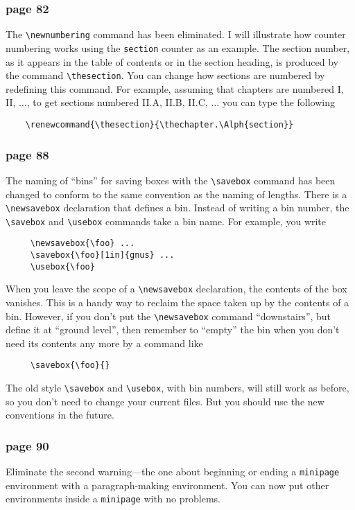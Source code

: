 \subsubsection*{page 82}
The \hbox{\verb"\newnumbering"} command has been eliminated.  I will
illustrate how counter numbering works using the \hbox{\verb"section"}
counter as an example.  The section number, as it appears in the
table of contents or in the section heading, is produced by the
command \hbox{\verb"\thesection"}.  You can change how sections
are numbered by redefining this command.  For example, assuming
that chapters are numbered I, II, $\ldots$, to get sections
numbered II.A, II.B, II.C, $\ldots$ you can type the following
\begin{verbatim}
    \renewcommand{\thesection}{\thechapter.\Alph{section}}
\end{verbatim}

\subsubsection*{page 88}
The naming of ``bins'' for saving boxes with the
\hbox{\verb"\savebox"} command has been changed to conform to the same
convention as the naming of lengths.  There is a
\hbox{\verb"\newsavebox"} declaration that defines a bin.  Instead of
writing a bin number, the \hbox{\verb"\savebox"} and
\hbox{\verb"\usebox"} commands take a bin name.  For example, you
write
\begin{verbatim}
     \newsavebox{\foo} ...
     \savebox{\foo}[1in]{gnus} ...
     \usebox{\foo}
\end{verbatim}
When you leave the scope of a \hbox{\verb"\newsavebox"} declaration,
the contents of the box vanishes.  This is a handy way to reclaim the
space taken up by the contents of a bin.  However, if you don't put
the \hbox{\verb"\newsavebox"} command  ``downstairs'', but define
it at ``ground level'', then remember to 
``empty'' the bin when you don't need its contents any more
by a command like
\begin{verbatim}
     \savebox{\foo}{}
\end{verbatim}
The old style \hbox{\verb"\savebox"} and \hbox{\verb"\usebox"}, with
bin numbers, will still work as before, so you don't need to change
your current files.  But you should use the new conventions in the
future.

\subsubsection*{page 90}
Eliminate the second warning---the one about beginning or ending a
\mbox{\tt minipage} environment with a paragraph-making environment.
You can now put other environments inside a \mbox{\tt minipage} with
no problems.

